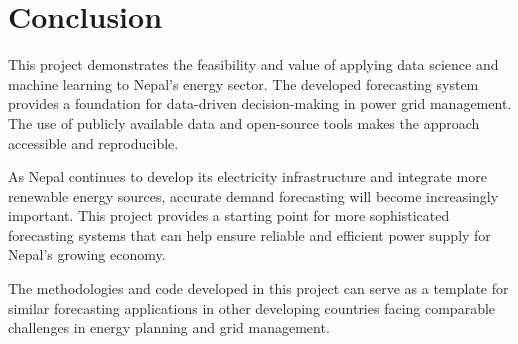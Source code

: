 \section{Conclusion}
This project demonstrates the feasibility and value of applying data science and machine learning to Nepal's energy sector. The developed forecasting system provides a foundation for data-driven decision-making in power grid management. The use of publicly available data and open-source tools makes the approach accessible and reproducible.

As Nepal continues to develop its electricity infrastructure and integrate more renewable energy sources, accurate demand forecasting will become increasingly important. This project provides a starting point for more sophisticated forecasting systems that can help ensure reliable and efficient power supply for Nepal's growing economy.

The methodologies and code developed in this project can serve as a template for similar forecasting applications in other developing countries facing comparable challenges in energy planning and grid management.